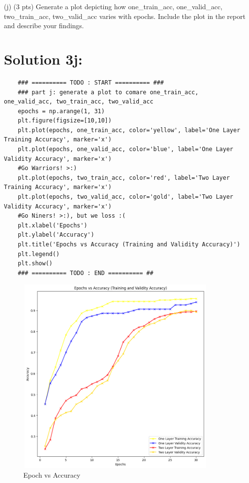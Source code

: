 \documentclass[10pt]{article}
\begin{document}
(j) (3 pts) Generate a plot depicting how one\_train\_acc, one\_valid\_acc, two\_train\_acc, two\_valid\_acc varies with epochs. Include the plot in the report and describe your findings.

\section*{Solution 3j:}

\begin{verbatim}
    ### ========== TODO : START ========== ###
    ### part j: generate a plot to comare one_train_acc, one_valid_acc, two_train_acc, two_valid_acc
    epochs = np.arange(1, 31)
    plt.figure(figsize=[10,10])
    plt.plot(epochs, one_train_acc, color='yellow', label='One Layer Training Accuracy', marker='x')
    plt.plot(epochs, one_valid_acc, color='blue', label='One Layer Validity Accuracy', marker='x')
    #Go Warriors! >:)
    plt.plot(epochs, two_train_acc, color='red', label='Two Layer Training Accuracy', marker='x')
    plt.plot(epochs, two_valid_acc, color='gold', label='Two Layer Validity Accuracy', marker='x')
    #Go Niners! >:), but we loss :(
    plt.xlabel('Epochs')
    plt.ylabel('Accuracy')
    plt.title('Epochs vs Accuracy (Training and Validity Accuracy)')
    plt.legend()
    plt.show()
    ### ========== TODO : END ========== ##
\end{verbatim}

\begin{figure}[h!]
    \centering
    \includegraphics[width= 10cm, height = 10cm]{images/4j.png}
    \caption{Epoch vs Accuracy}
    \label{fig:enter-label}
\end{figure} 
\end{document}
